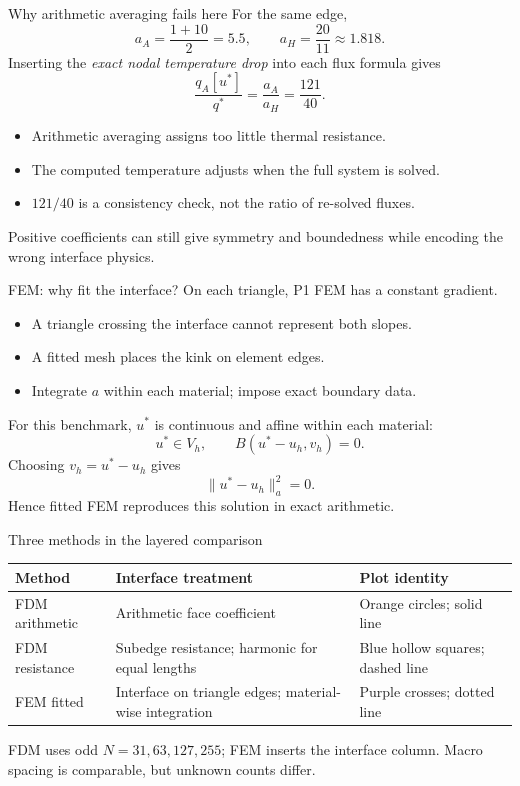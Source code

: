 \documentclass{beamer}
\begin{document}
\begin{frame}{Why arithmetic averaging fails here}
For the same edge,
\[a_A=\frac{1+10}{2}=5.5,\qquad a_H=\frac{20}{11}\approx1.818.\]
Inserting the \emph{exact nodal temperature drop} into each flux formula gives
\[\frac{q_A[u^*]}{q^*}=\frac{a_A}{a_H}=\frac{121}{40}.\]
\begin{itemize}
\item Arithmetic averaging assigns too little thermal resistance.
\item The computed temperature adjusts when the full system is solved.
\item $121/40$ is a consistency check, not the ratio of re-solved fluxes.
\end{itemize}
\small Positive coefficients can still give symmetry and boundedness while encoding the wrong interface physics.
\end{frame}

\begin{frame}{FEM: why fit the interface?}
On each triangle, P1 FEM has a constant gradient.
\begin{itemize}
\item A triangle crossing the interface cannot represent both slopes.
\item A fitted mesh places the kink on element edges.
\item Integrate $a$ within each material; impose exact boundary data.
\end{itemize}
For this benchmark, $u^*$ is continuous and affine within each material:
\[u^*\in V_h,\qquad B(u^*-u_h,v_h)=0.\]
Choosing $v_h=u^*-u_h$ gives
\[\|u^*-u_h\|_a^2=0.\]
Hence fitted FEM reproduces this solution in exact arithmetic.
\end{frame}

\begin{frame}{Three methods in the layered comparison}
\small
\begin{tabular}{>{\raggedright\arraybackslash}p{.26\linewidth}>{\raggedright\arraybackslash}p{.31\linewidth}>{\raggedright\arraybackslash}p{.31\linewidth}}
\toprule Method & Interface treatment & Plot identity\\\midrule
FDM arithmetic & Arithmetic face coefficient & Orange circles; solid line\\[1em]
FDM resistance & Subedge resistance; harmonic for equal lengths & Blue hollow squares; dashed line\\[1em]
FEM fitted & Interface on triangle edges; material-wise integration & Purple crosses; dotted line\\\bottomrule
\end{tabular}
\medskip

FDM uses odd $N=31,63,127,255$; FEM inserts the interface column.
Macro spacing is comparable, but unknown counts differ.
\end{frame}
\end{document}

